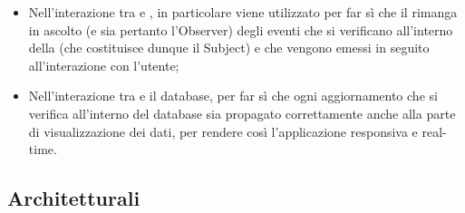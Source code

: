\begin{itemize}
\begin{itemize}
		  	 	\item Nell'interazione tra  e , in particolare viene utilizzato per far sì che il  rimanga in ascolto (e sia pertanto l'Observer) degli eventi che si verificano all'interno della  (che costituisce dunque il Subject) e che vengono emessi in seguito all'interazione con l'utente;
		  	 	\item Nell'interazione tra  e il database, per far sì che ogni aggiornamento che si verifica all'interno del database sia propagato correttamente anche alla parte di visualizzazione dei dati, per rendere così l'applicazione responsiva e real-time.
		  \end{itemize}
\end{itemize}

\subsection{Architetturali}
